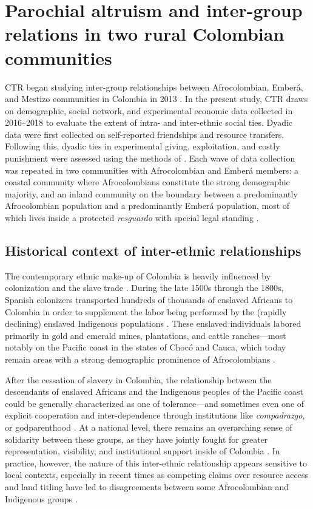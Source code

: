 \documentclass[bibauthoryear]{aa}
\begin{document}
\section{Parochial altruism and inter-group relations in two rural Colombian communities}
CTR began studying inter-group relationships between  Afrocolombian, Ember\'a, and  Mestizo communities in Colombia in 2013 \citep{ross2015frequency}. In the present study, CTR draws on demographic, social network, and experimental economic data collected in 2016--2018 to evaluate the extent of intra- and inter-ethnic social ties. Dyadic data were first collected on self-reported friendships and resource transfers. Following this, dyadic ties in experimental giving, exploitation, and costly punishment were assessed using the methods of \citet{gervais2017rich}. Each wave of data collection was repeated in two communities with Afrocolombian and Ember\'a members: a coastal community where Afrocolombians constitute the strong demographic majority, and an inland community \citep[previously studied by][]{Cay73} on the boundary between a predominantly Afrocolombian population and a predominantly Ember\'a population, most of which lives inside  a protected \emph{resguardo} with special legal standing \citep{MORAVERA2016}.



\subsection{Historical context of inter-ethnic relationships}\label{histcon}
The contemporary ethnic make-up of Colombia is heavily influenced by colonization and the slave trade \citep{Can00, wade2002introduction, castillo2009discourse}.  During the late 1500s through the 1800s, Spanish colonizers transported hundreds of thousands of enslaved Africans to Colombia in order to supplement the labor being performed by the (rapidly declining)  enslaved Indigenous populations \citep{slavenote, gilbertomurillo2001el}. 
 These enslaved individuals labored primarily in gold and emerald mines, plantations, and cattle ranches---most notably on the Pacific coast in the states of Choc\'o and Cauca, which today remain areas with a strong demographic prominence of Afrocolombians \citep{gilbertomurillo2001el, wade2002introduction}. 

After the cessation of slavery in Colombia, the relationship between the descendants of enslaved Africans and the Indigenous peoples  of the Pacific coast could be generally characterized as one of tolerance---and sometimes even one of explicit cooperation and inter-dependence through institutions like \textit{compadrazgo}, or godparenthood \citep{Cay73}. At a national level, there remains an overarching sense of solidarity between these groups, as they have jointly fought for greater representation, visibility, and institutional support inside of Colombia \citep{castillo2009discourse, iglesiasvoces}. In practice, however, the nature of this inter-ethnic relationship appears sensitive to local contexts, especially in recent times as competing claims over resource access and land titling have led to disagreements between some Afrocolombian and Indigenous groups \citep{ng2000titling, davis2002indigenous, garcia2009diversos, velasco2011contested}. 
 
\end{document}
